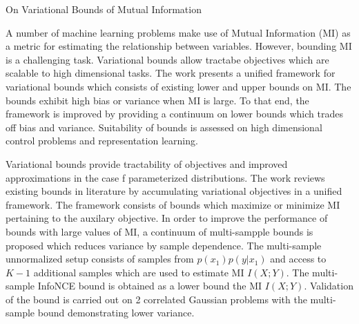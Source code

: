 \documentclass[11pt,letterpaper]{article}
\begin{document}
\begin{center}
  \large{On Variational Bounds of Mutual Information}
\end{center}



A number of machine learning problems make use of Mutual Information (MI) as a metric for estimating the relationship between variables. However, bounding MI is a challenging task. Variational bounds allow tractabe objectives which are scalable to high dimensional tasks. The work presents a unified framework for variational bounds which consists of existing lower and upper bounds on MI. The bounds exhibit high bias or variance when MI is large. To that end, the framework is improved by providing a continuum on lower bounds which trades off bias and variance. Suitability of bounds is assessed on high dimensional control problems and representation learning. 

Variational bounds provide tractability of objectives and improved approximations in the case f parameterized distributions. The work reviews existing bounds in literature by accumulating variational objectives in a unified framework. The framework consists of bounds which maximize or minimize MI pertaining to the auxilary objective. In order to improve the performance of bounds with large values of MI, a continuum of multi-sampple bounds is proposed which reduces variance by sample dependence. The multi-sample unnormalized setup consists of samples from $p(x_{1})p(y|x_{1})$ and access to $K-1$ additional samples which are used to estimate MI $I(X;Y)$. The multi-sample InfoNCE bound is obtained as a lower bound the MI $I(X;Y)$. Validation of the bound is carried out on 2 correlated Gaussian problems with the multi-sample bound demonstrating lower variance.
\end{document}

